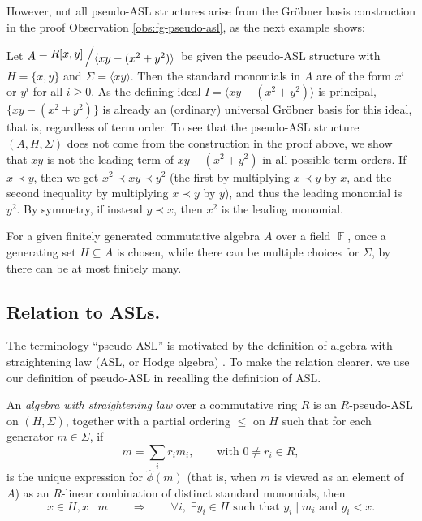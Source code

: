\documentclass[11pt,reqno]{amsart}
\DeclareMathOperator{\F}{\mathbb{F}}
\newcommand{\bigslant}[2]{{\raisebox{.2em}{$#1$}\left/\raisebox{-.2em}{$#2$}\right.}}
\newcommand{\divides}{\mid}
\theoremstyle{definition}
\numberwithin{equation}{section}
\begin{document}
However, not all pseudo-ASL structures arise from the Gröbner basis construction in the proof Observation \ref{obs:fg-pseudo-asl}, as the next example shows:

\begin{example} \label{ex:pASL}
Let $A = \bigslant{R[x,y]}{\langle xy - (x^2 + y^2) \rangle}$ be given the pseudo-ASL structure with $H = \{x,y\}$ and $\Sigma = \langle xy \rangle$. Then the standard monomials in $A$ are of the form $x^i$ or $y^i$ for all $i \geq 0$. As the defining ideal $I = \langle xy - (x^2 + y^2) \rangle$ is principal, $\{xy-(x^2+y^2)\}$ is already an (ordinary) universal Gröbner basis for this ideal, that is, regardless of term order. To see that the pseudo-ASL structure $(A,H,\Sigma)$ does not come from the construction in the proof above, we show that $xy$ is not the leading term of $xy - (x^2 + y^2)$ in all possible term orders. If $x \prec y$, then we get $x^2 \prec xy \prec y^2$ (the first by multiplying $x \prec y$ by $x$, and the second inequality by multiplying $x \prec y$ by $y$), and thus the leading monomial is $y^2$. By symmetry, if instead $y \prec x$, then $x^2$ is the leading monomial.
\end{example}

For a given finitely generated commutative algebra $A$ over a field $\F$, once a generating set $H \subseteq A$ is chosen, while there can be multiple choices for $\Sigma$, by \cite[Lemma~5.1.2]{bruns2022determinants} there can be at most finitely many.

\subsection{Relation to ASLs.} 
The terminology ``pseudo-ASL'' is motivated by the definition of algebra with straightening law (ASL, or Hodge algebra) \cite{deconcini1987hodge, eisenbud-intro-1980}. To make the relation clearer, we use our definition of pseudo-ASL in recalling the definition of ASL.

\begin{definition}
\label{defn:hodge-algebra}
An \emph{algebra with straightening law} over a commutative ring $R$ is an $R$-pseudo-ASL on $(H,\Sigma)$, together with a partial ordering $\leq$ on $H$ such that 
for each generator $m \in \Sigma$, if
\begin{equation}
\label{eqn:hodge-straightening}
m = \sum_i {r_{i} m_i}, \qquad \text{with }0 \neq r_i \in R,
\end{equation}
is the unique expression for $\hat{\phi}(m)$ (that is, when $m$ is viewed as an element of $A$) as an $R$-linear combination of distinct standard monomials, then 
\[
x \in H, x \divides m \qquad \Longrightarrow \qquad \forall i, \;\exists y_{i} \in H \text{ such that }y_i \divides m_i \text{ and }y_i < x.
\]
\end{definition}
\end{document}
